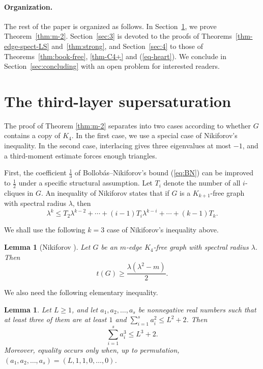\documentclass[10pt,a4paper]{amsart}
\newtheorem{lemma}[theorem]{Lemma}
\renewcommand{\le}{\leqslant}
\renewcommand{\ge}{\geqslant}
\begin{document}
\paragraph{Organization.}
The rest of the paper is organized as follows. 
In Section~\ref{sec:2}, we prove Theorem~\ref{thm:m-2}. 
Section~\ref{sec:3} is devoted to the proofs of Theorems~\ref{thm-edge-spect-LS} and~\ref{thm:strong}, 
and Section~\ref{sec:4} to those of Theorems~\ref{thm:book-free}, \ref{thm-C4+} 
and (\ref{eq-heart}). 
We conclude in Section~\ref{sec:concluding} with an open problem for interested readers.



\section{The third-layer supersaturation}

\label{sec:2}
The proof of Theorem \ref{thm:m-2} separates into two cases according to
whether $G$ contains a copy of $K_4$.  In the first case,  we use a special case of
Nikiforov's inequality.  In the second case, interlacing gives
three eigenvalues at most $-1$, and a third-moment estimate forces enough
triangles. 


First, the coefficient $\frac{1}{3}$ of Bollob\'{a}s--Nikiforov's bound (\ref{eq:BN}) can be improved to $\frac{1}{2}$ under a specific structural assumption. Let $T_i$ denote the number of all $i$-cliques in $G$.  
An inequality of Nikiforov \cite{Nikiforov2002} states that if $G$ is a $K_{k+1}$-free graph with spectral radius $\lambda$, then
\begin{equation*} 
\lambda^k \le T_2 \lambda^{k-2} + \cdots + (i-1)T_i \lambda^{k-i} + \cdots + (k-1)T_k.  
\end{equation*}


We shall use the following $k=3$ case of Nikiforov's inequality above.

\begin{lemma}[Nikiforov \cite{Nikiforov2002}]
\label{lem:K4free}
Let $G$ be an $m$-edge $K_4$-free graph with  spectral radius $\lambda $.  Then
\[
    t(G)\ge \frac{\lambda (\lambda^2-m)}{2}.
\]
\end{lemma}



We also need the following elementary inequality.

\begin{lemma}
\label{lem:cubes}
Let $L\ge 1$, and let $a_1,a_2,\dots,a_s$ be nonnegative real numbers such that at
least three of them are at least $1$ and
$\sum_{i=1}^s a_i^2\le L^2+2$. 
Then
\[
        \sum_{i=1}^s a_i^3\le L^3+2.
\]
Moreover, equality occurs only when, up to permutation, $ (a_1,a_2,\dots,a_s)=(L,1,1,0,\ldots ,0)$.
\end{lemma}
\end{document}
